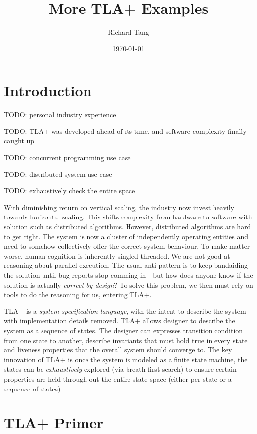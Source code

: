\documentclass{report}
\title{More TLA+ Examples}
\author{Richard Tang}
\date{\today}
\begin{document}
\maketitle
\tableofcontents

\chapter{Introduction}

TODO: personal industry experience 

TODO: TLA+ was developed ahead of its time, and software complexity finally
caught up 

TODO: concurrent programming use case 

TODO: distributed system use case

TODO: exhaustively check the entire space

With diminishing return on vertical scaling, the industry now invest heavily
towards horizontal scaling. This shifts complexity from hardware to software
with solution such as distributed algorithms. However, distributed algorithms
are hard to get right. The system is now a cluster of independently operating
entities and need to somehow collectively offer the correct system behaviour. To
make matter worse, human cognition is inherently singled threaded. We are not
good at reasoning about parallel execution. The usual anti-pattern is to keep
bandaiding the solution until bug reports stop comming in - but how does anyone
know if the solution is actually \textit{correct by design}? To solve this
problem, we then must rely on tools to do the reasoning for us, entering TLA+.
\newline

TLA+ is a \textit{system specification language}, with the intent to describe
the system with implementation details removed. TLA+ allows designer to
describe the system as a sequence of states. The designer can expresses
transition condition from one state to another, describe invariants that must
hold true in every state and liveness properties that the overall system should
converge to. The key innovation of TLA+ is once the system is modeled as a
finite state machine, the states can be \textit{exhaustively} explored (via
breath-first-search) to ensure certain properties are held through out the
entire state space (either per state or a sequence of states).\newline

\chapter{TLA+ Primer}
\end{document}
